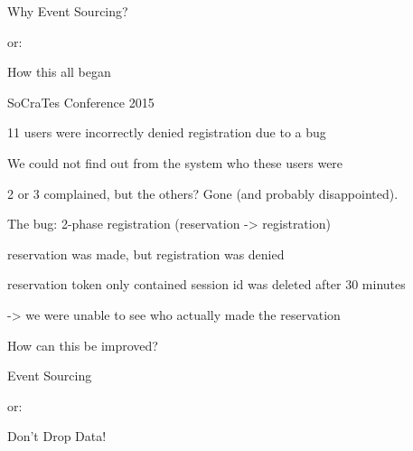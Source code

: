 \begin{frame}[fragile]{}

\begin{center}
{
\LARGE
Why Event Sourcing?
}

\vspace{2em}

or:

\vspace{2em}

{
\Large
How this all began
}
\end{center}
\end{frame}

\begin{frame}[fragile]{}

  SoCraTes Conference 2015
                  
                  11 users were incorrectly denied registration due to a bug
                  
                  We could not find out from the system who these users were
                  
                  2 or 3 complained, but the others? Gone (and probably disappointed).


\end{frame}

\begin{frame}[fragile]{}

The bug: 2-phase registration (reservation -> registration)
                  
                  reservation was made, but registration was denied
                  
                  reservation token only contained session id
                  was deleted after 30 minutes
                  
                  -> we were unable to see who actually made the reservation
                  
                  How can this be improved?
                  
\end{frame}

\begin{frame}[fragile]{}

\begin{center}
{
\LARGE
Event Sourcing
}

\vspace{2em}

or:

\vspace{2em}

{
\Large
Don't Drop Data!
}
\end{center}
\end{frame}

